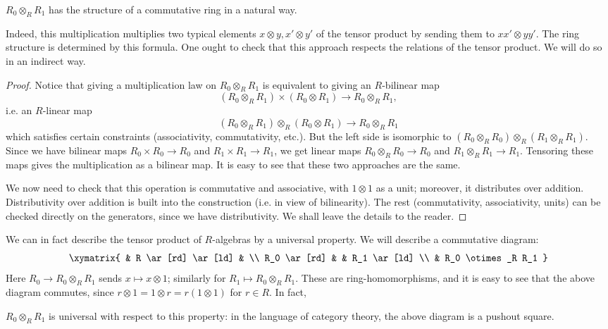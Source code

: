 \begin{proposition} 
$R_0 \otimes_R R_1$ has the structure of a commutative ring in a natural way.
\end{proposition} 

 Indeed, this
multiplication multiplies two typical elements $x \otimes y, x' \otimes y'$ of
the tensor product by
sending them to
$xx' \otimes yy'$.
The ring structure is determined by this formula.  One ought to check that this
approach respects the relations of the tensor product. We will do so in an
indirect way.


\begin{proof}
Notice that giving a multiplication law on $R_0 \otimes_R R_1$ is equivalent to giving an $R$-bilinear map
\[ (R_0 \otimes_R R_1) \times (R_0 \otimes R_1) \to R_0 \otimes_R R_1,\]
i.e. an $R$-linear map
\[ (R_0 \otimes_R R_1) \otimes_R (R_0 \otimes R_1) \to R_0 \otimes_R R_1\]
which satisfies certain constraints (associativity, commutativity, etc.).
But the left side is isomorphic to $(R_0 \otimes_R R_0) \otimes_R (R_1
\otimes_R R_1)$. Since we have bilinear maps $R_0 \times R_0 \to R_0$ and $R_1
\times R_1 \to R_1$, we get linear maps
$R_0 \otimes_R R_0 \to R_0$ and $R_1 \otimes_R R_1 \to R_1$.
Tensoring these maps gives the multiplication as a bilinear map. It is easy to
see that these two approaches are the same.

We now need to check that this operation is commutative and associative, with
$1 \otimes 1$ as a unit; moreover, it distributes over addition. Distributivity
over addition is built into the construction (i.e. in view of bilinearity). The
rest (commutativity, associativity, units) can be checked directly on the
generators, since we have distributivity.
We shall leave the details to the reader.
\end{proof}


We can in fact describe the tensor product of $R$-algebras by a universal
property. We will
describe a commutative diagram:
\[
\xymatrix{
& R \ar[rd] \ar[ld] & \\
R_0 \ar[rd] & & R_1 \ar[ld] \\
& R_0 \otimes_R R_1
}
\]
Here $R_0 \to R_0 \otimes_R R_1$ sends $x \mapsto x \otimes 1$; similarly for $R_1
\mapsto R_0 \otimes_R R_1$. These are ring-homomorphisms, and it is easy to
see that
the above
diagram commutes, since $r \otimes 1 = 1 \otimes r = r(1 \otimes 1)$ for $r \in
R$.
In fact,
\begin{proposition}
$R_0 \otimes_R R_1$ is universal with respect to this property: in the language
of category theory, the above diagram is a pushout square.
\end{proposition}

